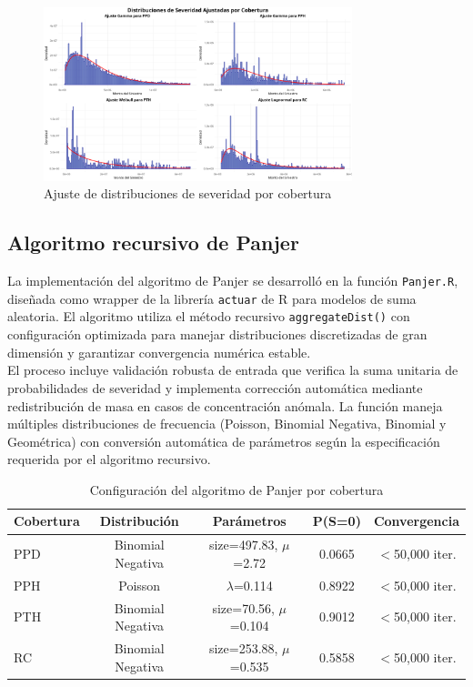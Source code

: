 \begin{figure}[H]
\centering
\includegraphics[width=0.8\textwidth]{../images/ajuste_distribuciones_severidad.png}
\caption{Ajuste de distribuciones de severidad por cobertura}
\end{figure}

\subsection{Algoritmo recursivo de Panjer}

La implementación del algoritmo de Panjer se desarrolló en la función \texttt{Panjer.R}, diseñada como wrapper de la librería \texttt{actuar} de R para modelos de suma aleatoria. El algoritmo utiliza el método recursivo \texttt{aggregateDist()} con configuración optimizada para manejar distribuciones discretizadas de gran dimensión y garantizar convergencia numérica estable.\\

El proceso incluye validación robusta de entrada que verifica la suma unitaria de probabilidades de severidad y implementa corrección automática mediante redistribución de masa en casos de concentración anómala. La función maneja múltiples distribuciones de frecuencia (Poisson, Binomial Negativa, Binomial y Geométrica) con conversión automática de parámetros según la especificación requerida por el algoritmo recursivo.

\begin{table}[H]
\centering
\caption{Configuración del algoritmo de Panjer por cobertura}
\begin{tabular}{lcccc}
\hline
\textbf{Cobertura} & \textbf{Distribución} & \textbf{Parámetros} & \textbf{P(S=0)} & \textbf{Convergencia} \\
\hline
PPD & Binomial Negativa & size=497.83, $\mu$=2.72 & 0.0665 & $<$50,000 iter. \\
PPH & Poisson & $\lambda$=0.114 & 0.8922 & $<$50,000 iter. \\
PTH & Binomial Negativa & size=70.56, $\mu$=0.104 & 0.9012 & $<$50,000 iter. \\
RC & Binomial Negativa & size=253.88, $\mu$=0.535 & 0.5858 & $<$50,000 iter. \\
\hline
\end{tabular}
\end{table}


